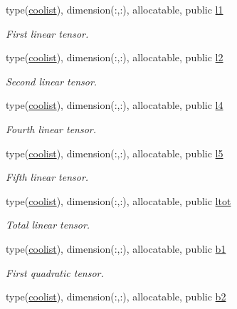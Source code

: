 \begin{DoxyCompactItemize}
type(\hyperlink{structtensor_1_1coolist}{coolist}), dimension(\+:,\+:), allocatable, public \hyperlink{namespacewl__tensor_aa309444c23a52a0e43329bf59cef9b4a}{l1}
\begin{DoxyCompactList}\small\item\em First linear tensor. \end{DoxyCompactList}\item 
type(\hyperlink{structtensor_1_1coolist}{coolist}), dimension(\+:,\+:), allocatable, public \hyperlink{namespacewl__tensor_aa4f45dfb65512833eea93c9c49ca94e1}{l2}
\begin{DoxyCompactList}\small\item\em Second linear tensor. \end{DoxyCompactList}\item 
type(\hyperlink{structtensor_1_1coolist}{coolist}), dimension(\+:,\+:), allocatable, public \hyperlink{namespacewl__tensor_ad4231065a820c662308e0bfb85e58bf1}{l4}
\begin{DoxyCompactList}\small\item\em Fourth linear tensor. \end{DoxyCompactList}\item 
type(\hyperlink{structtensor_1_1coolist}{coolist}), dimension(\+:,\+:), allocatable, public \hyperlink{namespacewl__tensor_a3205f1dbfef2da92755dbff79dbe05d5}{l5}
\begin{DoxyCompactList}\small\item\em Fifth linear tensor. \end{DoxyCompactList}\item 
type(\hyperlink{structtensor_1_1coolist}{coolist}), dimension(\+:,\+:), allocatable, public \hyperlink{namespacewl__tensor_afd79a2a5beca62333d1b791582c848d1}{ltot}
\begin{DoxyCompactList}\small\item\em Total linear tensor. \end{DoxyCompactList}\item 
type(\hyperlink{structtensor_1_1coolist}{coolist}), dimension(\+:,\+:), allocatable, public \hyperlink{namespacewl__tensor_a6ffcc1305329bf3f57ab21e715172613}{b1}
\begin{DoxyCompactList}\small\item\em First quadratic tensor. \end{DoxyCompactList}\item 
type(\hyperlink{structtensor_1_1coolist}{coolist}), dimension(\+:,\+:), allocatable, public \hyperlink{namespacewl__tensor_a297e5f32373d65ccaeaba0c5b00fb27c}{b2}

\end{DoxyCompactItemize}
